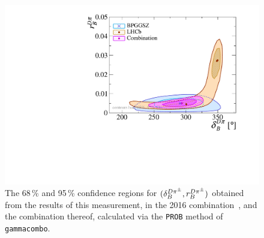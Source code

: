 \begin{figure}[tp]
    \centering
    \includegraphics[width=0.47\columnwidth]{figures/analysis/interpretation/2d_d_dpi_r_dpi_vs_old_lhcb_prob.pdf}
    \caption{The 68\,\% and 95\,\% confidence regions for $(\delta_B^{D\pi^\pm}, r_B^{D\pi^\pm})$ obtained from the results of this measurement, in the 2016 \lhcb combination~\cite{LHCb-PAPER-2016-032}, and the combination thereof, calculated via the \texttt{PROB} method of \texttt{gammacombo}.}
    \label{fig:lhcb_dpi_comp_2d}
\end{figure}

